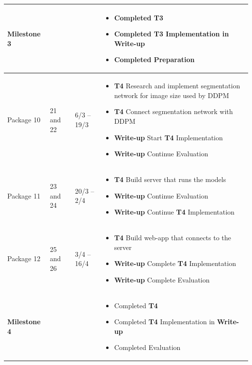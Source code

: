 \documentclass{article}
\begin{document}
\begin{longtable}{p{2.5cm}p{1.5cm}P{2.5cm}P{6.8cm}}
    \textbf{Milestone 3} &
    &
    &
    \begin{itemize}[label={--},noitemsep,leftmargin=*,topsep=0pt,partopsep=0pt]
      \item Completed \textbf{T3}
      \item Completed \textbf{T3} Implementation in \textbf{Write-up}
      \item Completed Preparation
    \end{itemize}\\
    \hline

    Package 10 &
    21 and 22  &
    6/3 -- 19/3 &
    \begin{itemize}[label={--},noitemsep,leftmargin=*,topsep=0pt,partopsep=0pt]
      \item \textbf{T4} Research and implement segmentation network for image size used by DDPM
      \item \textbf{T4} Connect segmentation network with DDPM
      \item \textbf{Write-up} Start \textbf{T4} Implementation
      \item \textbf{Write-up} Continue Evaluation
    \end{itemize}\\
    \hline

    Package 11 &
    23 and 24  &
    20/3 -- 2/4 &
    \begin{itemize}[label={--},noitemsep,leftmargin=*,topsep=0pt,partopsep=0pt]
      \item \textbf{T4} Build server that runs the models
      \item \textbf{Write-up} Continue Evaluation
      \item \textbf{Write-up} Continue \textbf{T4} Implementation
    \end{itemize}\\
    \hline

    Package 12 &
    25 and 26  &
    3/4 -- 16/4 &
    \begin{itemize}[label={--},noitemsep,leftmargin=*,topsep=0pt,partopsep=0pt]
      \item \textbf{T4} Build web-app that connects to the server
      \item \textbf{Write-up} Complete \textbf{T4} Implementation
      \item \textbf{Write-up} Complete Evaluation
    \end{itemize}\\
    \hline

    \textbf{Milestone 4} &
    &
    &
    \begin{itemize}[label={--},noitemsep,leftmargin=*,topsep=0pt,partopsep=0pt]
      \item Completed \textbf{T4}
      \item Completed \textbf{T4} Implementation in \textbf{Write-up}
      \item Completed Evaluation
    \end{itemize}\\
    \hline


\end{longtable}
\end{document}
